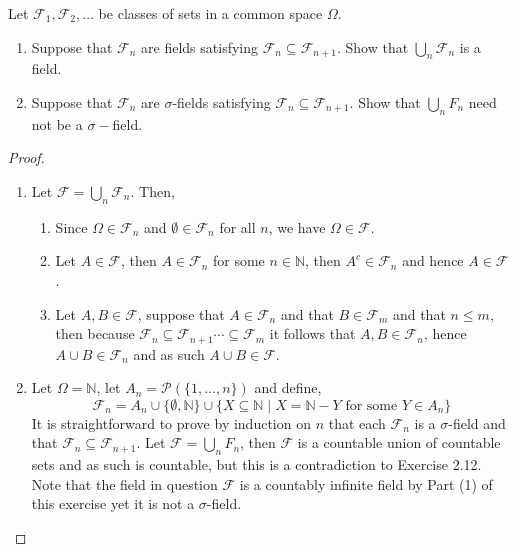 \documentclass[11pt]{article}
\newcommand{\N}{\mathbb{N}}
\newcommand{\F}{\mathcal{F}}
\newcommand{\seq}{\subseteq}
\newcommand{\Om}{\Omega}
\newcommand{\es}{\emptyset}
\newcommand{\mc}{\mathcal}
\newcommand{\un}{\cup}
\newenvironment{exercise}[2][Exercise]{\begin{trivlist}
\item[\hskip \labelsep {\bfseries #1}\hskip \labelsep {\bfseries #2.}]}{\end{trivlist}}
\begin{document}
\begin{exercise}{2.4}
    Let $\F_1, \F_2, \ldots$ be classes of sets in a common space $\Om$.
    \begin{enumerate}
        \item Suppose that $\F_n$ are fields satisfying $\F_n \seq \F_{n+1}$. Show that $\bigcup_{n} \F_n$ is a field.
        \item Suppose that $\F_n$ are $\sigma$-fields satisfying $\F_n \seq \F_{n+1}$. Show that $\bigcup_{n} F_n$ need not be a $\sigma-$field.
    \end{enumerate}
\end{exercise}
\begin{proof}
    \begin{enumerate}
        \item Let $\F = \bigcup_{n} \F_n$. Then,
        \begin{enumerate}
            \item Since $\Om \in \F_n$ and $\es \in \F_n$ for all $n$, we have $\Om \in \F$.
            \item Let $A \in \F$, then $A \in \F_n$ for some $n \in \N$, then $A^{c} \in \F_n$ and hence $A \in \F$.
            \item Let $A, B \in \F$, suppose that $A \in \F_n$ and that $B \in \F_m$ and that $n \leq m$, then because $\F_n \seq \F_{n+1} \cdots \seq\F_m $ it follows that $A, B \in \F_n$, hence $A \un B \in \F_n$ and as such $A \un B \in \F$.
        \end{enumerate}
        \item Let $\Om = \N$, let $A_n = \mc P (\{ 1, \ldots, n \})$ and define,
        \[ \F_n = A_n \un \{ \es, \N \} \un \{ X \seq \N \mid X = \N - Y \text { for some } Y \in A_n\}  \]
        It is straightforward to prove by induction on $n$ that each $\F_n$ is a $\sigma$-field and that $\F_n \seq \F_{n+1}$. Let $\F = \bigcup_{n} F_n$, then $\F$ is a countable union of countable sets and as such is countable, but this is a contradiction to Exercise 2.12. Note that the field in question $\F$ is a countably infinite field by Part (1) of this exercise yet it is not a $\sigma$-field.
    \end{enumerate}
\end{proof}
\end{document}
